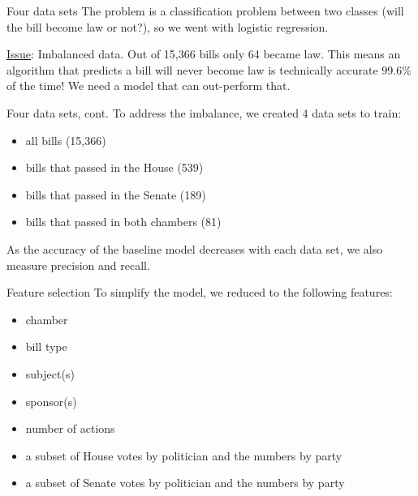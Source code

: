 \documentclass[handout,
	12pt]{beamer}
\begin{document}
\begin{frame}{Four data sets}{}
The problem is a classification problem between two classes (will the bill become law or not?), so we went with logistic regression.  

\pause
\vspace{1pc}
\underline{Issue}:  Imbalanced data.  Out of 15,366 bills only 64 became law.  This means an algorithm that predicts a bill will never become law is technically accurate 99.6\% of the time!  We need a model that can out-perform that.
\end{frame}

\begin{frame}{Four data sets, cont.}{}
To address the imbalance, we created 4 data sets to train:

\pause
\begin{multicols}{2}
\begin{itemize}
\itemsep0em
\item all bills (15,366)
\pause
\item bills that passed in the House (539)
\pause
\item bills that passed in the Senate (189)
\pause
\item bills that passed in both chambers (81)
\end{itemize}
\end{multicols}
\pause
As the accuracy of the baseline model decreases with each data set, we also measure precision and recall.
\end{frame}

\begin{frame}{Feature selection}{}
To simplify the model, we reduced to the following features:
\pause
\begin{itemize}
\itemsep0em
\item chamber
\item bill type
\item subject(s)
\item sponsor(s)
\item number of actions
\item a subset of House votes by politician and the numbers by party
\item a subset of Senate votes by politician and the numbers by party
\end{itemize}
\pause
\end{frame}
\end{document}
